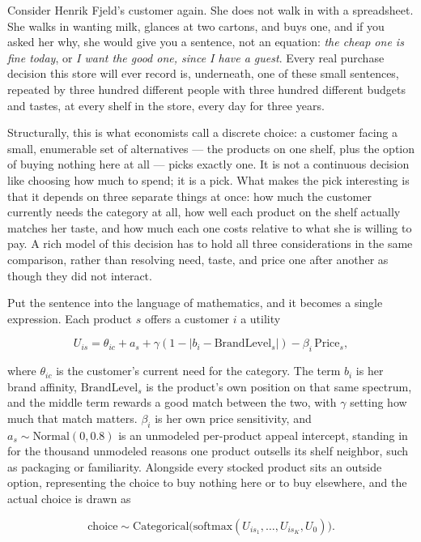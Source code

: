 \documentclass[12pt,a4paper]{article}
\begin{document}
Consider Henrik Fjeld's customer again. She does not walk in with a
spreadsheet. She walks in wanting milk, glances at two cartons, and buys
one, and if you asked her why, she would give you a sentence, not an
equation: \emph{the cheap one is fine today}, or \emph{I want the good
one, since I have a guest}. Every real purchase decision this store will
ever record is, underneath, one of these small sentences, repeated by
three hundred different people with three hundred different budgets and
tastes, at every shelf in the store, every day for three years.

Structurally, this is what economists call a discrete choice: a customer
facing a small, enumerable set of alternatives --- the products on one
shelf, plus the option of buying nothing here at all --- picks exactly
one. It is not a continuous decision like choosing how much to spend;
it is a pick. What makes the pick interesting is that it depends on
three separate things at once: how much the customer currently needs the
category at all, how well each product on the shelf actually matches her
taste, and how much each one costs relative to what she is willing to
pay. A rich model of this decision has to hold all three considerations
in the same comparison, rather than resolving need, taste, and price one
after another as though they did not interact.

Put the sentence into the language of mathematics, and it becomes a
single expression. Each product $s$ offers a customer $i$ a utility

\[
U_{is} = \theta_{ic} + a_s + \gamma\left(1 - \left|b_i -
\text{BrandLevel}_s\right|\right) - \beta_i\,\text{Price}_s ,
\]

where $\theta_{ic}$ is the customer's current need for the category. The
term $b_i$ is her brand affinity, $\text{BrandLevel}_s$ is the product's
own position on that same spectrum, and the middle term rewards a good
match between the two, with $\gamma$ setting how much that match matters.
$\beta_i$ is her own price sensitivity, and $a_s \sim \text{Normal}(0,
0.8)$ is an unmodeled per-product appeal intercept, standing in for the thousand
unmodeled reasons one product outsells its shelf neighbor, such as
packaging or familiarity. Alongside every stocked product sits an
outside option, representing the choice to buy nothing here or to buy
elsewhere, and the actual choice is drawn as

\[
\text{choice} \sim \text{Categorical}\big(\text{softmax}(U_{is_1}, \ldots,
U_{is_K}, U_0)\big) .
\]
\end{document}
